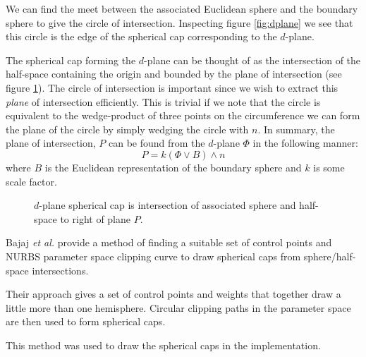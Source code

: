 We can find the meet between the associated Euclidean sphere and the
boundary sphere to give the circle of intersection. Inspecting figure
\ref{fig:dplane} we
see that this circle is the edge of the spherical
cap corresponding to the $d$-plane.

The spherical cap forming the $d$-plane can be thought of as the
intersection of the half-space containing the origin and bounded
by the plane of intersection (see figure \ref{fig:sphereplane}).
The circle of intersection is important since we wish to extract
this \emph{plane} of intersection efficiently. This is trivial
if we note that the circle is equivalent to the wedge-product of three
points on the circumference we can form the plane of the circle
by simply wedging the circle with $n$. In summary,
the plane of intersection, $P$ can be found from the $d$-plane $\Phi$ in
the following manner:
\[
P = k (\Phi \vee B) \wedge n
\]
where $B$ is the Euclidean representation of the boundary sphere
and $k$ is some scale factor.

\begin{figure} \centering
{}
\caption{$d$-plane spherical cap is intersection of associated sphere and half-space
to right of plane $P$.}
\label{fig:sphereplane}
\end{figure}

Bajaj \emph{et al.} \cite{spherecap} provide a method of finding
a suitable set of control points and NURBS parameter space clipping
curve to draw spherical caps from sphere/half-space intersections.

Their approach gives a set of control points and weights that together
draw a little more than one hemisphere. Circular clipping paths in the 
parameter space are then used to form spherical caps.

This method was used to draw the spherical caps in the implementation.

